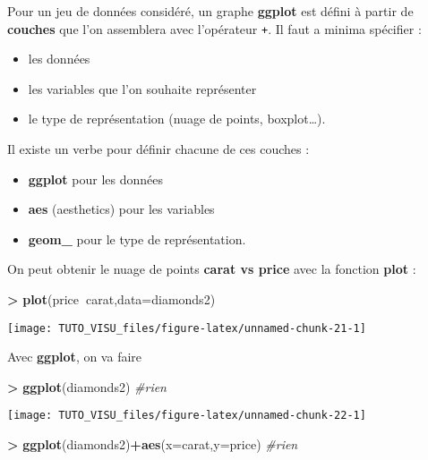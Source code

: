 \documentclass[]{article}
\newenvironment{Shaded}{\begin{snugshade}}{\end{snugshade}}
\newcommand{\CommentTok}[1]{\textcolor[rgb]{0.56,0.35,0.01}{\textit{#1}}}
\newcommand{\DataTypeTok}[1]{\textcolor[rgb]{0.13,0.29,0.53}{#1}}
\newcommand{\KeywordTok}[1]{\textcolor[rgb]{0.13,0.29,0.53}{\textbf{#1}}}
\newcommand{\NormalTok}[1]{#1}
\newcommand{\OperatorTok}[1]{\textcolor[rgb]{0.81,0.36,0.00}{\textbf{#1}}}
\newcommand{\StringTok}[1]{\textcolor[rgb]{0.31,0.60,0.02}{#1}}
\providecommand{\tightlist}{%
  \setlength{\itemsep}{0pt}\setlength{\parskip}{0pt}}
\theoremstyle{definition}
\theoremstyle{definition}
\theoremstyle{definition}
\theoremstyle{remark}
\begin{document}
Pour un jeu de données considéré, un graphe \textbf{ggplot} est défini à partir de \textbf{couches} que l'on assemblera avec l'opérateur \texttt{+}. Il faut a minima spécifier :

\begin{itemize}
\tightlist
\item
  les données
\item
  les variables que l'on souhaite représenter
\item
  le type de représentation (nuage de points, boxplot\ldots{}).
\end{itemize}

Il existe un verbe pour définir chacune de ces couches :

\begin{itemize}
\tightlist
\item
  \textbf{ggplot} pour les données
\item
  \textbf{aes} (aesthetics) pour les variables
\item
  \textbf{geom\_} pour le type de représentation.
\end{itemize}

On peut obtenir le nuage de points \textbf{carat vs price} avec la fonction \textbf{plot} :

\begin{Shaded}
\begin{Highlighting}[]
\OperatorTok{>}\StringTok{ }\KeywordTok{plot}\NormalTok{(price}\OperatorTok{~}\NormalTok{carat,}\DataTypeTok{data=}\NormalTok{diamonds2)}
\end{Highlighting}
\end{Shaded}

\begin{center}\texttt{[image: TUTO\_VISU\_files/figure-latex/unnamed-chunk-21-1]} \end{center}

Avec \textbf{ggplot}, on va faire

\begin{Shaded}
\begin{Highlighting}[]
\OperatorTok{>}\StringTok{ }\KeywordTok{ggplot}\NormalTok{(diamonds2) }\CommentTok{#rien}
\end{Highlighting}
\end{Shaded}

\begin{center}\texttt{[image: TUTO\_VISU\_files/figure-latex/unnamed-chunk-22-1]} \end{center}

\begin{Shaded}
\begin{Highlighting}[]
\OperatorTok{>}\StringTok{ }\KeywordTok{ggplot}\NormalTok{(diamonds2)}\OperatorTok{+}\KeywordTok{aes}\NormalTok{(}\DataTypeTok{x=}\NormalTok{carat,}\DataTypeTok{y=}\NormalTok{price) }\CommentTok{#rien}
\end{Highlighting}
\end{Shaded}
\end{document}
